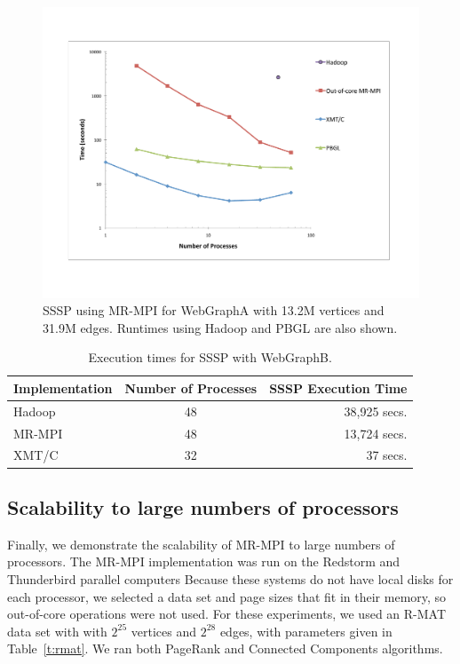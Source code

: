\begin{figure}[h!]
\includegraphics[width=\textwidth]{fig_ssspA.pdf}
\caption{SSSP using MR-MPI for WebGraphA with
13.2M vertices and 31.9M edges.  Runtimes using Hadoop and PBGL
are also shown.}
\label{f:ssspA}
\end{figure}

\begin{table}
\begin{tabular}{|l|c|r|}
\hline
Implementation & Number of Processes & SSSP Execution Time \\
\hline
Hadoop & 48  & 38,925 secs.\\
MR-MPI & 48 &  13,724 secs.\\
XMT/C  & 32 &  37 secs.\\
\hline
\end{tabular}
\caption{Execution times for SSSP with {WebGraphB}.}
\label{t:ssspB}
\end{table}



\subsection{Scalability to large numbers of processors}
Finally, we demonstrate the scalability of MR-MPI to large numbers of 
processors.  
The MR-MPI implementation was run on the Redstorm and Thunderbird
parallel computers
Because these systems do not have local disks for each processor, we selected 
a data set and page sizes that fit in their memory, so out-of-core operations
were not used.  For these experiments, we used an R-MAT data set with 
with $2^{25}$ vertices and $2^{28}$ edges, with parameters given in
Table~\ref{t:rmat}.  We ran both PageRank and Connected Components
algorithms.

